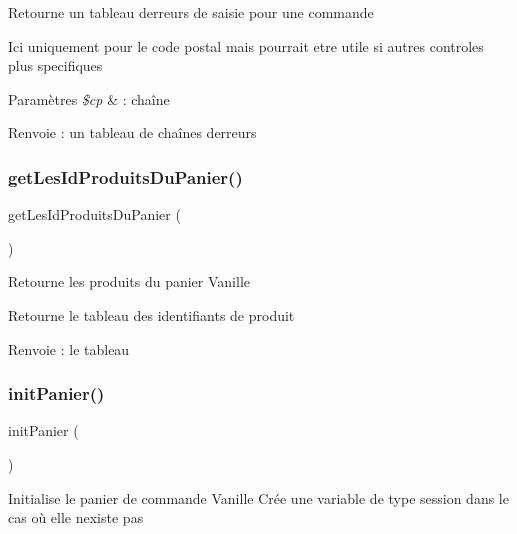Retourne un tableau d\textquotesingle{}erreurs de saisie pour une commande

Ici uniquement pour le code postal mais pourrait etre utile si autres controles plus specifiques 
\begin{DoxyParams}{Paramètres}
{\em \$cp} & \+: chaîne \\
\hline
\end{DoxyParams}
\begin{DoxyReturn}{Renvoie}
\+: un tableau de chaînes d\textquotesingle{}erreurs 
\end{DoxyReturn}
\mbox{\label{fonctions_8inc_8php_a59a95455bd9ca8f5253abd17d3072a97}} 
\subsubsection{\texorpdfstring{get\+Les\+Id\+Produits\+Du\+Panier()}{getLesIdProduitsDuPanier()}}
{\footnotesize\ttfamily get\+Les\+Id\+Produits\+Du\+Panier (\begin{DoxyParamCaption}{ }\end{DoxyParamCaption})}

Retourne les produits du panier Vanille

Retourne le tableau des identifiants de produit \begin{DoxyReturn}{Renvoie}
\+: le tableau 
\end{DoxyReturn}
\mbox{\label{fonctions_8inc_8php_a7c3f3b6845445b896480e3bd6b9ec6ae}} 
\subsubsection{\texorpdfstring{init\+Panier()}{initPanier()}}
{\footnotesize\ttfamily init\+Panier (\begin{DoxyParamCaption}{ }\end{DoxyParamCaption})}

Initialise le panier de commande Vanille Crée une variable de type session dans le cas où elle n\textquotesingle{}existe pas \mbox{\label{fonctions_8inc_8php_a40295a28174a0eccf95afe21322bbab7}} 
